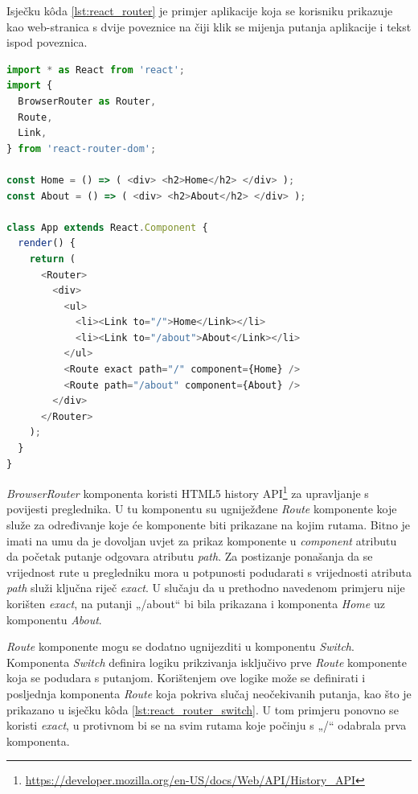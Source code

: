 \documentclass[times, utf8, diplomski, numeric]{fer}
\newcommand{\razmakp}{\vspace{18pt}}
\newcommand{\razmaks}{\vspace{10pt}}
\begin{document}
\razmakp

Isječku kôda \ref{lst:react_router} je primjer aplikacije koja se korisniku prikazuje kao web-stranica s dvije poveznice na čiji klik se mijenja putanja aplikacije i tekst ispod poveznica.

\newpage %
\begin{lstlisting}[language=JavaScript, caption={Primjer korištenja React Router biblioteke}, label={lst:react_router}]
import * as React from 'react';
import {
  BrowserRouter as Router,
  Route,
  Link,
} from 'react-router-dom';

const Home = () => ( <div> <h2>Home</h2> </div> );
const About = () => ( <div> <h2>About</h2> </div> );

class App extends React.Component {
  render() {
    return (
      <Router>
        <div>
          <ul>
            <li><Link to="/">Home</Link></li>
            <li><Link to="/about">About</Link></li>
          </ul>
          <Route exact path="/" component={Home} />
          <Route path="/about" component={About} />
        </div>
      </Router>
    );
  }
}
\end{lstlisting}
\razmaks

\emph{BrowserRouter} komponenta koristi HTML5 history API\footnote{\url{https://developer.mozilla.org/en-US/docs/Web/API/History_API}} za upravljanje s povijesti preglednika.
U tu komponentu su ugniježđene \emph{Route} komponente koje služe za određivanje koje će komponente biti prikazane na kojim rutama.
Bitno je imati na umu da je dovoljan uvjet za prikaz komponente u \emph{component} atributu da početak putanje odgovara atributu \emph{path}.
Za postizanje ponašanja da se vrijednost rute u pregledniku mora u potpunosti podudarati s vrijednosti atributa \emph{path} služi ključna riječ \emph{exact}.
U slučaju da u prethodno navedenom primjeru nije korišten \emph{exact}, na putanji „/about“ bi bila prikazana i komponenta \emph{Home} uz komponentu \emph{About}.

\emph{Route} komponente mogu se dodatno ugnijezditi u komponentu \emph{Switch}.
Komponenta \emph{Switch} definira logiku prikzivanja isključivo prve \emph{Route} komponente koja se podudara s putanjom.
Korištenjem ove logike može se definirati i posljednja komponenta \emph{Route} koja pokriva slučaj neočekivanih putanja, kao što je prikazano u isječku kôda \ref{lst:react_router_switch}.
U tom primjeru ponovno se koristi \emph{exact}, u protivnom bi se na svim rutama koje počinju s „/“ odabrala prva komponenta.
\end{document}
